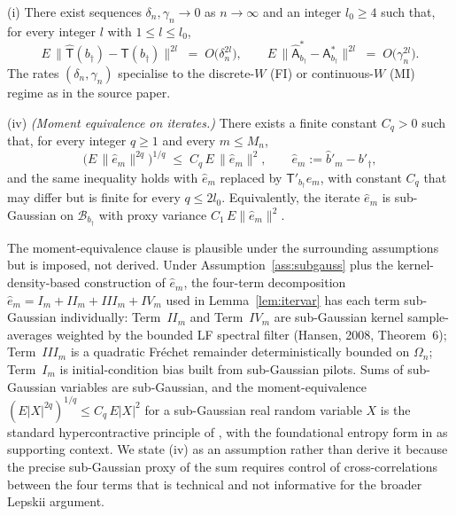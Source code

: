 \begin{assumption}\label{ass:rateconv}
\textup{(i)} There exist sequences $\delta_n, \gamma_n \to 0$ as
$n \to \infty$ and an integer $l_0 \ge 4$ such that, for every integer $l$
with $1 \le l \le l_0$,
\[
E\,\bigl\|\hat{\mathsf T}(b_\dagger) - \mathsf T(b_\dagger)\bigr\|^{2l}
\;=\; O\!\bigl(\delta_n^{2l}\bigr),
\qquad
E\,\bigl\|\hat{\mathsf A}^{*}_{b_\dagger} - \mathsf A^{*}_{b_\dagger}\bigr\|^{2l}
\;=\; O\!\bigl(\gamma_n^{2l}\bigr).
\]
The rates $(\delta_n, \gamma_n)$ specialise to the discrete-$W$ (FI) or
continuous-$W$ (MI) regime as in the source paper.

\textup{(iv)} \emph{(Moment equivalence on iterates.)} There exists a
finite constant $C_q > 0$ such that, for every integer $q \ge 1$ and every
$m \le M_n$,
\[
\bigl(E\,\|\hat e_m\|^{2q}\bigr)^{1/q}
\;\le\; C_q\, E\,\|\hat e_m\|^{2},
\qquad
\hat e_m := \hat b'_m - b'_\dagger,
\]
and the same inequality holds with $\hat e_m$ replaced by
$\mathsf T'_{b_\dagger}\hat e_m$, with constant $C_q$ that may differ but
is finite for every $q \le 2l_0$. Equivalently, the iterate $\hat e_m$ is
sub-Gaussian on $\mathcal{B}_{b_\dagger}$ with proxy variance
$C_1\,E\|\hat e_m\|^{2}$.
\end{assumption}

\begin{remark}\label{rem:hyper}
The moment-equivalence clause is plausible under the surrounding
assumptions but is imposed, not derived. Under
Assumption~\ref{ass:subgauss} plus the kernel-density-based construction
of $\hat e_m$, the four-term decomposition
$\hat e_m = I_m + II_m + III_m + IV_m$ used in
Lemma~\ref{lem:itervar} has each term sub-Gaussian individually:
Term~$II_m$ and Term~$IV_m$ are sub-Gaussian kernel sample-averages
weighted by the bounded LF spectral filter (Hansen, 2008,
Theorem~6); Term~$III_m$ is a quadratic Fr\'echet remainder
deterministically bounded on $\Omega_n$; Term~$I_m$ is initial-condition
bias built from sub-Gaussian pilots. Sums of sub-Gaussian variables are
sub-Gaussian, and the moment-equivalence
$(E|X|^{2q})^{1/q} \le C_q\,E|X|^2$ for a sub-Gaussian real random
variable $X$ is the standard hypercontractive principle of
\citet[Theorem~2.5.2]{vershynin2018}, with the foundational entropy
form in \citet[Ch.~2]{boucheron2013} as supporting context. We state
\textup{(iv)} as an assumption rather than derive it because the
precise sub-Gaussian proxy of the sum requires control of
cross-correlations between the four terms that is technical and not
informative for the broader Lepskii argument.
\end{remark}

